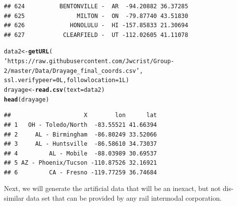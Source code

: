 \documentclass{article}\usepackage[]{graphicx}\usepackage[]{color}
\makeatletter
\newcommand{\hlnum}[1]{\textcolor[rgb]{0.686,0.059,0.569}{#1}}%
\newcommand{\hlstr}[1]{\textcolor[rgb]{0.192,0.494,0.8}{#1}}%
\newcommand{\hlstd}[1]{\textcolor[rgb]{0.345,0.345,0.345}{#1}}%
\newcommand{\hlkwb}[1]{\textcolor[rgb]{0.69,0.353,0.396}{#1}}%
\newcommand{\hlkwc}[1]{\textcolor[rgb]{0.333,0.667,0.333}{#1}}%
\newcommand{\hlkwd}[1]{\textcolor[rgb]{0.737,0.353,0.396}{\textbf{#1}}}%
\newenvironment{kframe}{%
 \def\at@end@of@kframe{}%
 \ifinner\ifhmode%
  \def\at@end@of@kframe{\end{minipage}}%
  \begin{minipage}{\columnwidth}%
 \fi\fi%
 \def\FrameCommand##1{\hskip\@totalleftmargin \hskip-\fboxsep
 \colorbox{shadecolor}{##1}\hskip-\fboxsep
     \hskip-\linewidth \hskip-\@totalleftmargin \hskip\columnwidth}%
 \MakeFramed {\advance\hsize-\width
   \@totalleftmargin\z@ \linewidth\hsize
   \@setminipage}}%
 {\par\unskip\endMakeFramed%
 \at@end@of@kframe}
\newenvironment{knitrout}{}{} %
\makeatother
\begin{document}
\begin{knitrout}
\begin{kframe}
\begin{verbatim}
## 624          BENTONVILLE -  AR  -94.20882 36.37285
## 625               MILTON -  ON  -79.87740 43.51830
## 626             HONOLULU -  HI -157.85833 21.30694
## 627           CLEARFIELD -  UT -112.02605 41.11078
\end{verbatim}
\begin{alltt}
\hlstd{data2} \hlkwb{<-} \hlkwd{getURL}\hlstd{(}
  \hlstr{'https://raw.githubusercontent.com/Jwcrist/Group-2/master/Data/Drayage_final_coords.csv'}\hlstd{,}
  \hlkwc{ssl.verifypeer}\hlstd{=}\hlnum{0L}\hlstd{,} \hlkwc{followlocation}\hlstd{=}\hlnum{1L}\hlstd{)}
\hlstd{drayage} \hlkwb{<-} \hlkwd{read.csv}\hlstd{(}\hlkwc{text}\hlstd{=data2)}
\hlkwd{head}\hlstd{(drayage)}
\end{alltt}
\begin{verbatim}
##                     X        lon      lat
## 1   OH - Toledo/North  -83.55521 41.66394
## 2     AL - Birmingham  -86.80249 33.52066
## 3     AL - Huntsville  -86.58610 34.73037
## 4         AL - Mobile  -88.03989 30.69537
## 5 AZ - Phoenix/Tucson -110.87526 32.16921
## 6         CA - Fresno -119.77259 36.74684
\end{verbatim}
\end{kframe}
\end{knitrout}

Next, we will generate the artificial data that will be an inexact, but not dis-similar data set that can be provided by any rail intermodal corporation.
\end{document}
